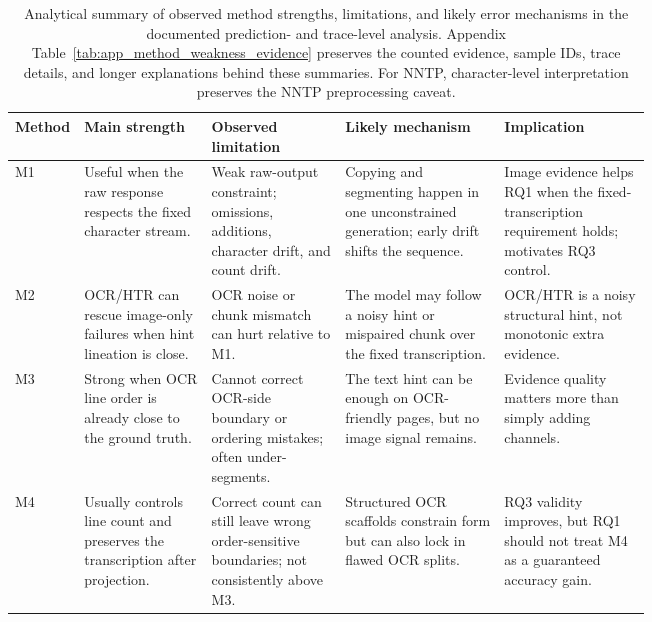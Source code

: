 \begin{table}[!htbp]
  \centering
  \caption{Analytical summary of observed method strengths, limitations, and likely error mechanisms in the documented prediction- and trace-level analysis. Appendix Table~\ref{tab:app_method_weakness_evidence} preserves the counted evidence, sample IDs, trace details, and longer explanations behind these summaries. For NNTP, character-level interpretation preserves the NNTP preprocessing caveat.}
  \label{tab:exp_method_weakness_mechanisms}
  \footnotesize
  \setlength{\tabcolsep}{3pt}
  \renewcommand{\arraystretch}{1.10}
  \begin{tabularx}{\linewidth}{@{}>{\raggedright\arraybackslash}p{0.075\linewidth}>{\raggedright\arraybackslash}p{0.20\linewidth}>{\raggedright\arraybackslash}p{0.21\linewidth}>{\raggedright\arraybackslash}p{0.25\linewidth}Y@{}}
    \toprule
    \textbf{Method} & \textbf{Main strength} & \textbf{Observed limitation} & \textbf{Likely mechanism} & \textbf{Implication} \\
    \midrule
    M1 & Useful when the raw response respects the fixed character stream. & Weak raw-output constraint; omissions, additions, character drift, and count drift. & Copying and segmenting happen in one unconstrained generation; early drift shifts the sequence. & Image evidence helps RQ1 when the fixed-transcription requirement holds; motivates RQ3 control. \\
    \addlinespace[0.35em]
    M2 & OCR/HTR can rescue image-only failures when hint lineation is close. & OCR noise or chunk mismatch can hurt relative to M1. & The model may follow a noisy hint or mispaired chunk over the fixed transcription. & OCR/HTR is a noisy structural hint, not monotonic extra evidence. \\
    \addlinespace[0.35em]
    M3 & Strong when OCR line order is already close to the ground truth. & Cannot correct OCR-side boundary or ordering mistakes; often under-segments. & The text hint can be enough on OCR-friendly pages, but no image signal remains. & Evidence quality matters more than simply adding channels. \\
    \addlinespace[0.35em]
    M4 & Usually controls line count and preserves the transcription after projection. & Correct count can still leave wrong order-sensitive boundaries; not consistently above M3. & Structured OCR scaffolds constrain form but can also lock in flawed OCR splits. & RQ3 validity improves, but RQ1 should not treat M4 as a guaranteed accuracy gain. \\

\end{tabularx}
\end{table}
